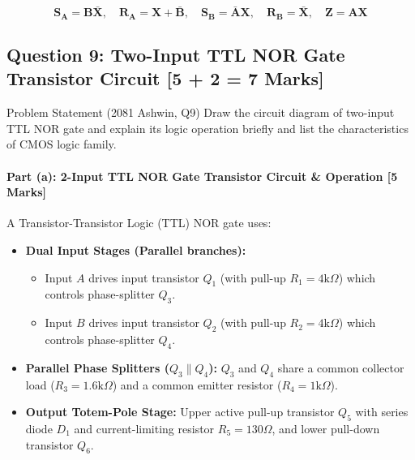 \documentclass[11pt,a4paper,oneside]{book}
\begin{document}
\begin{answerbox}
$$\mathbf{S_A = B\bar{X}, \quad R_A = X + \bar{B}, \quad S_B = \bar{A}X, \quad R_B = \bar{X}, \quad Z = AX}$$
\end{answerbox}

\vspace{0.6cm}

\subsection{Question 9: Two-Input TTL NOR Gate Transistor Circuit [5 + 2 = 7 Marks]}
\begin{questionbox}{Problem Statement (2081 Ashwin, Q9)}
Draw the circuit diagram of two-input TTL NOR gate and explain its logic operation briefly and list the characteristics of CMOS logic family.
\end{questionbox}

\paragraph{Part (a): 2-Input TTL NOR Gate Transistor Circuit \& Operation [5 Marks]}
A Transistor-Transistor Logic (TTL) NOR gate uses:
\begin{itemize}
  \item \textbf{Dual Input Stages (Parallel branches):}
  \begin{itemize}
    \item Input $A$ drives input transistor $Q_1$ (with pull-up $R_1 = 4\text{k}\Omega$) which controls phase-splitter $Q_3$.
    \item Input $B$ drives input transistor $Q_2$ (with pull-up $R_2 = 4\text{k}\Omega$) which controls phase-splitter $Q_4$.
  \end{itemize}
  \item \textbf{Parallel Phase Splitters ($Q_3 \parallel Q_4$):}
  $Q_3$ and $Q_4$ share a common collector load ($R_3 = 1.6\text{k}\Omega$) and a common emitter resistor ($R_4 = 1\text{k}\Omega$).
  \item \textbf{Output Totem-Pole Stage:}
  Upper active pull-up transistor $Q_5$ with series diode $D_1$ and current-limiting resistor $R_5 = 130\Omega$, and lower pull-down transistor $Q_6$.
\end{itemize}
\end{document}
